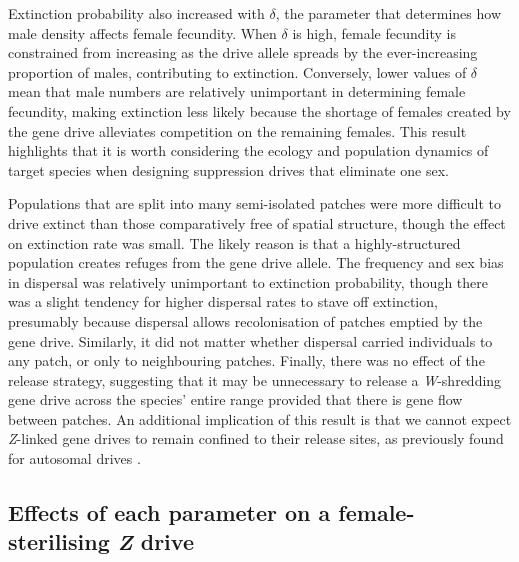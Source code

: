 \documentclass[]{rsos}%
\begin{document}
Extinction probability also increased with \(\delta\), the parameter
that determines how male density affects female fecundity. When
\(\delta\) is high, female fecundity is constrained from increasing as
the drive allele spreads by the ever-increasing proportion of males,
contributing to extinction. Conversely, lower values of \(\delta\) mean
that male numbers are relatively unimportant in determining female
fecundity, making extinction less likely because the shortage of females
created by the gene drive alleviates competition on the remaining
females. This result highlights that it is worth considering the ecology
and population dynamics of target species when designing suppression
drives that eliminate one sex.

Populations that are split into many semi-isolated patches were more
difficult to drive extinct than those comparatively free of spatial
structure, though the effect on extinction rate was small. The likely
reason is that a highly-structured population creates refuges from the
gene drive allele. The frequency and sex bias in dispersal was
relatively unimportant to extinction probability, though there was a
slight tendency for higher dispersal rates to stave off extinction,
presumably because dispersal allows recolonisation of patches emptied by
the gene drive. Similarly, it did not matter whether dispersal carried
individuals to any patch, or only to neighbouring patches. Finally,
there was no effect of the release strategy, suggesting that it may be
unnecessary to release a \emph{W}-shredding gene drive across the
species' entire range provided that there is gene flow between patches.
An additional implication of this result is that we cannot expect
\emph{Z}-linked gene drives to remain confined to their release sites,
as previously found for autosomal drives \citep{noble2018cu}.

\hypertarget{effects-of-each-parameter-on-a-female-sterilising-z-drive}{%
\subsection{\texorpdfstring{Effects of each parameter on a
female-sterilising \emph{Z}
drive}{Effects of each parameter on a female-sterilising Z drive}}\label{effects-of-each-parameter-on-a-female-sterilising-z-drive}}
\end{document}
